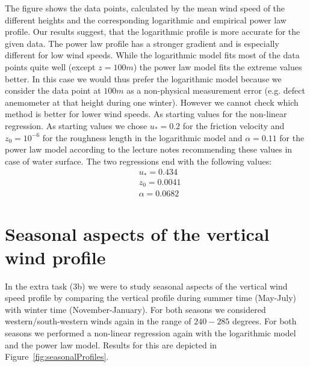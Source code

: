 \documentclass[10pt]{article}
\begin{document}
The figure shows the data points, calculated by the mean wind speed of the different heights and the corresponding logarithmic and empirical power law profile.
Our results suggest, that the logarithmic profile is more accurate for the given data. The power law profile has a stronger gradient and is especially different for low wind speeds. While the logarithmic model fits most of the data points quite well (except $z=100m$) the power law model fits the extreme values better. In this case we would thus prefer the logarithmic model because we consider the data point at $100m$ as a non-physical measurement error (e.g. defect anemometer at that height during one winter). However we cannot check which method is better for lower wind speeds. As starting values for the non-linear regression. As starting values we chose $u_{*}=0.2$ for the friction velocity and $z_0 = 10^{-6}$ for the roughness length in the logarithmic model and $\alpha=0.11$ for the power law model according to the lecture notes recommending these values in case of water surface.
The two regressions end with the following values:
\begin{align*}
&u_{*}= 0.434\\
&z_0 = 0.0041\\
&\alpha = 0.0682
\end{align*}
\newpage

\section{Seasonal aspects of the vertical wind profile}
In the extra task (3b) we were to study seasonal aspects of the vertical wind speed profile by comparing the vertical profile during summer time (May-July) with winter time (November-January). For both seasons we considered western/south-western winds again in the range of $240 - 285$ degrees. For both seasons we performed a non-linear regression again with the logarithmic model and the power law model. Results for this are depicted in Figure~\ref{fig:seasonalProfiles}.
\end{document}
